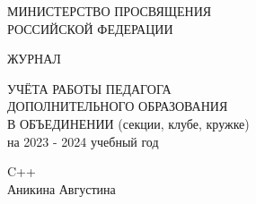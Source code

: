 \documentclass{article}
\begin{document}


\thispagestyle{empty}
\begin{center}

 {\huge МИНИСТЕРСТВО ПРОСВЯЩЕНИЯ }
\\
{\huge  РОССИЙСКОЙ ФЕДЕРАЦИИ }

\vspace{50mm} %
{\huge  ЖУРНАЛ }
\vspace{30mm} %

{\huge УЧЁТА РАБОТЫ ПЕДАГОГА }
\\
\vspace{2mm} %
{\huge ДОПОЛНИТЕЛЬНОГО ОБРАЗОВАНИЯ }
\\
\vspace{2mm} %
{\huge  В ОБЪЕДИНЕНИИ (секции, клубе, кружке) }
\\
\vspace{2mm} %
{\huge  на 2023 - 2024 учебный год }

\vspace{50mm} %
{\huge C++  }
\\
\vspace{2mm} %
{\huge Аникина Августина  }

\end{center}
\end{document}
